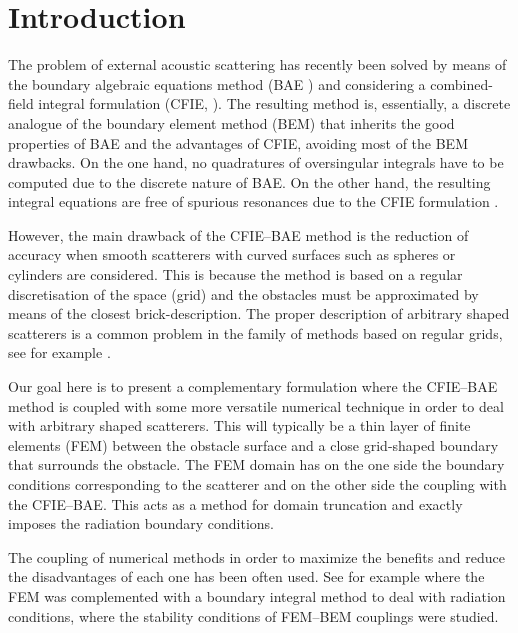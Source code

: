 \documentclass[12pt]{article}
\begin{document}
\section{Introduction}

The problem of external acoustic scattering has recently been solved \cite{poblet-PVS:2015} by means of the boundary algebraic equations method (BAE \cite{Martinsson-Rodin:2009,Gillman-Martinsson:2010,Tsukerman:2011,Bhat-Osting:2009}) and considering a combined-field integral formulation (CFIE, \cite{Burton-Miller:1971,kirkup:1998}). The resulting method is, essentially, a discrete analogue of the boundary element method (BEM) that inherits the good properties of BAE and the advantages of CFIE, avoiding most of the BEM drawbacks. On the one hand, no quadratures of oversingular integrals have to be computed due to the discrete nature of BAE. On the other hand, the resulting integral equations are free of spurious resonances due to the CFIE formulation \cite{poblet-PVS:2014}.

However, the main drawback of the CFIE--BAE method is the reduction of accuracy when smooth scatterers with curved surfaces such as spheres or cylinders are considered. This is because the method is based on a regular discretisation of the space (grid) and the obstacles must be approximated by means of the closest brick-description. The proper description of arbitrary shaped scatterers is a common problem in the family of methods based on regular grids, see for example \cite{medvinsky-MTT:2013}.

Our goal here is to present a complementary formulation where the CFIE--BAE method is coupled with some more versatile numerical technique in order to deal with arbitrary shaped scatterers. This will typically be a thin layer of finite elements (FEM) between the obstacle surface and a close grid-shaped boundary that surrounds the obstacle. The FEM domain has on the one side the boundary conditions corresponding to the scatterer and on the other side the coupling with the CFIE--BAE. This acts as a method for domain truncation and exactly imposes the radiation boundary conditions.

The coupling of numerical methods in order to maximize the benefits and reduce the disadvantages of each one has been often used. See for example \cite{Zienkiewicz-ZKB:1977} where the FEM was complemented with a boundary integral method to deal with radiation conditions, \cite{JohnsonNedelec:1980} where the stability conditions of FEM--BEM couplings were studied.
\end{document}
